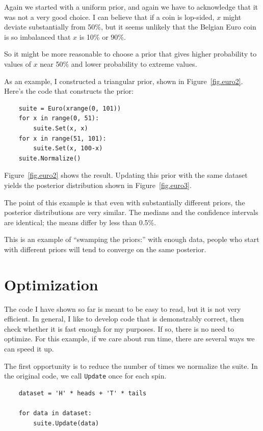 \documentclass[12pt]{book}
\begin{document}
Again we started with a uniform prior, and again we have to
acknowledge that it was not a very good choice. I can believe
that if a coin is lop-sided, $x$ might deviate substantially from
50\%, but it seems unlikely that the Belgian Euro coin is so
imbalanced that $x$ is 10\% or 90\%.

So it might be more reasonable to choose a prior that gives
higher probability to values of $x$ near 50\% and lower probability
to extreme values.

As an example, I constructed a triangular prior, shown in
Figure~\ref{fig.euro2}.  Here's the code that constructs the prior:

\begin{verbatim}
    suite = Euro(xrange(0, 101))
    for x in range(0, 51):
        suite.Set(x, x)
    for x in range(51, 101):
        suite.Set(x, 100-x) 
    suite.Normalize()
\end{verbatim}

Figure~\ref{fig.euro2} shows the result.  Updating this prior
with the same dataset yields the posterior distribution shown
in Figure~\ref{fig.euro3}.

The point of this example is that even with substantially different
priors, the posterior distributions are very similar.  The medians
and the confidence intervals are identical; the means differ by
less than 0.5\%.

This is an example of ``swamping the priors:'' with enough
data, people who start with different priors will tend to
converge on the same posterior.


\section{Optimization}

The code I have shown so far is meant to be easy to read, but it
is not very efficient.  In general, I like to develop code that
is demonstrably correct, then check whether it is fast enough for
my purposes.  If so, there is no need to optimize.
For this example, if we care about run time,
there are several ways we can speed it up.

The first opportunity is to reduce the number of times we
normalize the suite.
In the original code, we call \verb"Update" once for each spin.

\begin{verbatim}
    dataset = 'H' * heads + 'T' * tails

    for data in dataset:
        suite.Update(data)
\end{verbatim}
\end{document}
